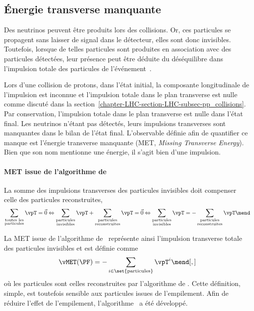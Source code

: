 \subsection{Énergie transverse manquante}\label{chapter-CMS-section-MET}
Des neutrinos peuvent être produits lors des collisions.
Or, ces particules se propagent sans laisser de signal dans le détecteur, elles sont donc invisibles.
Toutefois, lorsque de telles particules sont produites en association avec des particules détectées, leur présence peut être déduite du déséquilibre dans l'impulsion totale des particules de l'événement~\cite{CMS-PAS-JME-17-001}.
\par
Lors d'une collision de protons, dans l'état initial,
la composante longitudinale de l'impulsion est inconnue
et
l'impulsion totale dans le plan transverse est nulle
comme discuté dans la section~\ref{chapter-LHC-section-LHC-subsec-pp_collisions}.
Par conservation, l'impulsion totale dans le plan transverse est nulle dans l'état final.
Les neutrinos n'étant pas détectés, leurs impulsions transverses sont manquantes dans le bilan de l'état final.
L'observable définie afin de quantifier ce manque est
l'énergie transverse manquante (MET, \emph{Missing Transverse Energy}).
Bien que son nom mentionne une énergie, il s'agit bien d'une impulsion.
\par
\paragraph{MET issue de l'algorithme de \PF}
La somme des impulsions transverses des particules invisibles doit compenser celle des particules reconstruites, \ie
\begin{equation}
\sum_{\substack{\text{toutes les}\\\text{particules}}} \vpT = \vec{0}
\Leftrightarrow
\sum_{\substack{\text{particules}\\\text{invisibles}}} \vpT + \sum_{\substack{\text{particules}\\\text{reconstruites}}} \vpT = \vec{0}
\Leftrightarrow
\sum_{\substack{\text{particules}\\\text{invisibles}}} \vpT = -\sum_{\substack{\text{particules}\\\text{reconstruites}}} \vpT \mend
\end{equation}
\par La MET issue de l'algorithme de \PF\ représente ainsi l'impulsion transverse totale des particules invisibles et est définie comme
\begin{equation}
\vMET(\text{\PF}) = -\sum_{i\in\set{\text{particules}}} \vpT^{i}
\mend[,]
\end{equation}
où les particules sont celles reconstruites par l'algorithme de \PF.
Cette définition, simple, est toutefois sensible aux particules issues de l'empilement.
Afin de réduire l'effet de l'empilement, l'algorithme \PUPPI\ a été développé.

